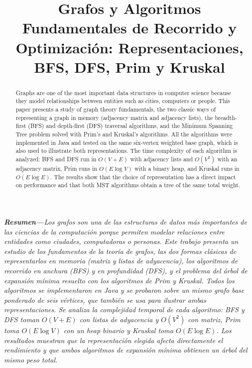 \documentclass[conference]{IEEEtran}
\begin{document}
\title{Grafos y Algoritmos Fundamentales de Recorrido y Optimización: Representaciones, BFS, DFS, Prim y Kruskal}

\author{
}

\maketitle

\begin{abstract}
Graphs are one of the most important data structures in computer science because they model relationships between entities such as cities, computers or people. This paper presents a study of graph theory fundamentals, the two classic ways of representing a graph in memory (adjacency matrix and adjacency lists), the breadth-first (BFS) and depth-first (DFS) traversal algorithms, and the Minimum Spanning Tree problem solved with Prim's and Kruskal's algorithms. All the algorithms were implemented in Java and tested on the same six-vertex weighted base graph, which is also used to illustrate both representations. The time complexity of each algorithm is analyzed: BFS and DFS run in $O(V+E)$ with adjacency lists and $O(V^2)$ with an adjacency matrix, Prim runs in $O(E\log V)$ with a binary heap, and Kruskal runs in $O(E\log E)$. The results show that the choice of representation has a direct impact on performance and that both MST algorithms obtain a tree of the same total weight.
\end{abstract}

\vspace{2mm}
\noindent\textbf{\textit{Resumen---}}\textit{Los grafos son una de las estructuras de datos más importantes de las ciencias de la computación porque permiten modelar relaciones entre entidades como ciudades, computadoras o personas. Este trabajo presenta un estudio de los fundamentos de la teoría de grafos, las dos formas clásicas de representarlos en memoria (matriz y listas de adyacencia), los algoritmos de recorrido en anchura (BFS) y en profundidad (DFS), y el problema del árbol de expansión mínima resuelto con los algoritmos de Prim y Kruskal. Todos los algoritmos se implementaron en Java y se probaron sobre un mismo grafo base ponderado de seis vértices, que también se usa para ilustrar ambas representaciones. Se analiza la complejidad temporal de cada algoritmo: BFS y DFS toman $O(V+E)$ con listas de adyacencia y $O(V^2)$ con matriz, Prim toma $O(E\log V)$ con un heap binario y Kruskal toma $O(E\log E)$. Los resultados muestran que la representación elegida afecta directamente el rendimiento y que ambos algoritmos de expansión mínima obtienen un árbol del mismo peso total.}
\end{document}

